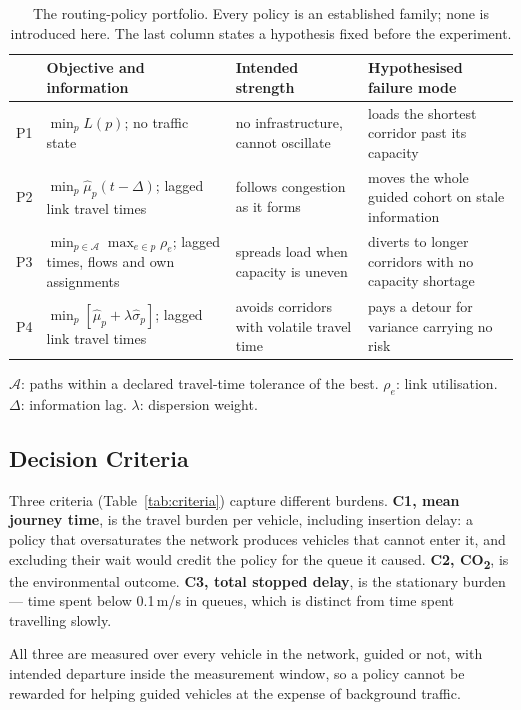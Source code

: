 \documentclass[runningheads]{llncs}
\newcommand{\CO}{CO\textsubscript{2}}
\begin{document}
\begin{table}[tbp]
\caption{The routing-policy portfolio. Every policy is an established family;
none is introduced here. The last column states a hypothesis fixed before the
experiment.}
\label{tab:portfolio}
\centering\footnotesize
\setlength{\tabcolsep}{4pt}
\begin{tabular}{@{}l p{} p{} p{}@{}}
\toprule
& Objective and information & Intended strength & Hypothesised failure mode\\
\midrule
P1 & $\min_p L(p)$; no traffic state &
  no infrastructure, cannot oscillate &
  loads the shortest corridor past its capacity\\[3pt]
P2 & $\min_p \hat\mu_p(t-\Delta)$; lagged link travel times &
  follows congestion as it forms &
  moves the whole guided cohort on stale information\\[3pt]
P3 & $\min_{p\in\mathcal{A}} \max_{e\in p}\rho_e$; lagged times, flows and own
  assignments &
  spreads load when capacity is uneven &
  diverts to longer corridors with no capacity shortage\\[3pt]
P4 & $\min_p [\hat\mu_p + \lambda\hat\sigma_p]$; lagged link travel times &
  avoids corridors with volatile travel time &
  pays a detour for variance carrying no risk\\
\bottomrule
\end{tabular}

\medskip
\footnotesize $\mathcal{A}$: paths within a declared travel-time tolerance of
the best. $\rho_e$: link utilisation. $\Delta$: information lag. $\lambda$:
dispersion weight.
\end{table}
\subsection{Decision Criteria}
\label{sec:criteria}

Three criteria (Table~\ref{tab:criteria}) capture different burdens.
\textbf{C1, mean journey time}, is the travel burden per vehicle, including
insertion delay: a policy that oversaturates the network produces vehicles that
cannot enter it, and excluding their wait would credit the policy for the queue
it caused. \textbf{C2, \CO{}}, is the environmental outcome. \textbf{C3, total
stopped delay}, is the stationary burden --- time spent below 0.1\,m/s in
queues, which is distinct from time spent travelling slowly.

All three are measured over every vehicle in the network, guided or not, with
intended departure inside the measurement window, so a policy cannot be
rewarded for helping guided vehicles at the expense of background traffic.
\end{document}

